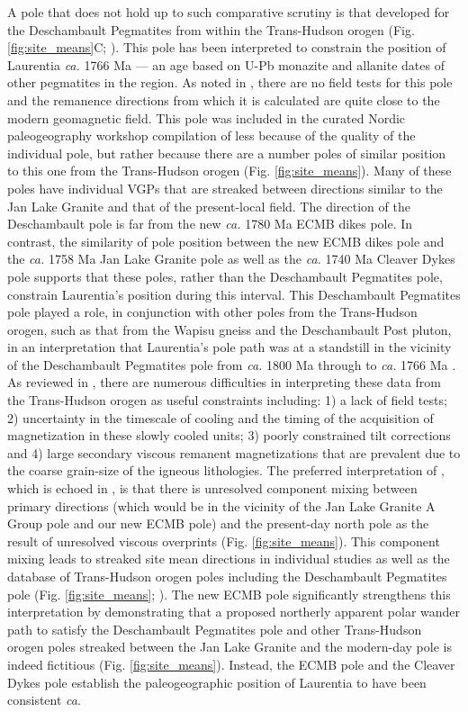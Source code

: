 \documentclass[draft]{agujournal2019}
\begin{document}
 A pole that does not hold up to such comparative scrutiny is that developed for the Deschambault Pegmatites from within the Trans-Hudson orogen (Fig. \ref{fig:site_means}C; ).  This pole has been interpreted to constrain the position of Laurentia \textit{ca.} 1766 Ma --- an age based on U-Pb monazite and allanite dates of other pegmatites in the region. As noted in , there are no field tests for this pole and the remanence directions from which it is calculated are quite close to the modern geomagnetic field. This pole was included in the curated Nordic paleogeography workshop compilation of   less because of the quality of the individual pole, but rather because there are a number poles of similar position to this one from the Trans-Hudson orogen (Fig. \ref{fig:site_means}). Many of these poles have individual VGPs that are streaked between directions similar to the Jan Lake Granite and that of the present-local field. The direction of the Deschambault pole is far from the new \textit{ca.} 1780 Ma ECMB dikes pole. In contrast, the similarity of pole position between the new ECMB dikes pole and the \textit{ca.} 1758 Ma Jan Lake Granite pole as well as the \textit{ca.} 1740 Ma Cleaver Dykes pole supports that these poles, rather than the Deschambault Pegmatites pole, constrain Laurentia's position during this interval. This Deschambault Pegmatites pole played a role, in conjunction with other poles from the Trans-Hudson orogen, such as that from the Wapisu gneiss and the Deschambault Post pluton, in an interpretation that Laurentia's pole path was at a standstill in the vicinity of the Deschambault Pegmatites pole from \textit{ca.} 1800 Ma through to \textit{ca.} 1766 Ma \cite{Symons2000a, Symons2005a}. As reviewed in , there are numerous difficulties in interpreting these data from the Trans-Hudson orogen as useful constraints including: 1) a lack of field tests; 2) uncertainty in the timescale of cooling and the timing of the acquisition of magnetization in these slowly cooled units; 3) poorly constrained tilt corrections and 4) large secondary viscous remanent magnetizations that are prevalent due to the coarse grain-size of the igneous lithologies. The preferred interpretation of , which is echoed in , is that there is unresolved component mixing between primary directions (which would be in the vicinity of the Jan Lake Granite A Group pole and our new ECMB pole) and the present-day north pole as the result of unresolved viscous overprints (Fig. \ref{fig:site_means}). This component mixing leads to streaked site mean directions in individual studies as well as the database of Trans-Hudson orogen poles including the Deschambault Pegmatites pole (Fig. \ref{fig:site_means}; ). The new ECMB pole significantly strengthens this interpretation by demonstrating that a proposed northerly apparent polar wander path to satisfy the Deschambault Pegmatites pole and other Trans-Hudson orogen poles streaked between the Jan Lake Granite and the modern-day pole is indeed fictitious (Fig. \ref{fig:site_means}). Instead, the ECMB pole and the Cleaver Dykes pole establish the paleogeographic position of Laurentia to have been consistent \textit{ca}. 
\end{document}
